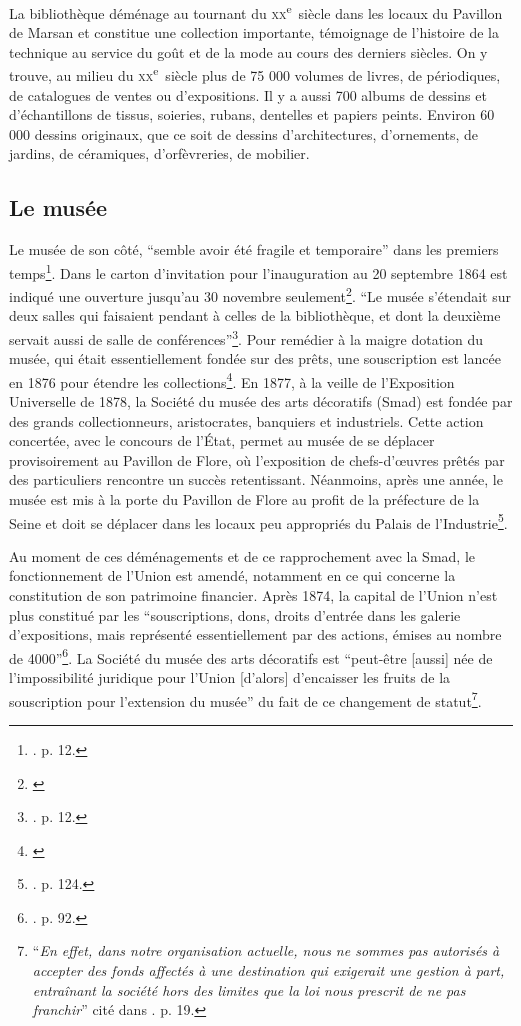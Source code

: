 La bibliothèque déménage au tournant du \textsc{xx}\textsuperscript{e}~siècle dans les locaux du Pavillon de Marsan et constitue une collection importante, témoignage de l'histoire de la technique au service du goût et de la mode au cours des derniers siècles. On y trouve, au milieu du \textsc{xx}\textsuperscript{e}~siècle plus de 75 000 volumes de livres, de périodiques, de catalogues de ventes ou d'expositions. Il y a aussi 700 albums de dessins et d'échantillons de tissus, soieries, rubans, dentelles et papiers peints. Environ 60 000 dessins originaux, que ce soit de dessins d'architectures, d'ornements, de jardins, de céramiques, d'orfèvreries, de mobilier. \hfill \pagebreak

\subsection{Le musée}

Le musée de son côté, \enquote{semble avoir été fragile et temporaire} dans les premiers temps\footnote{\cite{gady_dessin_2020}. p. 12.}. Dans le carton d'invitation pour l'inauguration au 20 septembre 1864 est indiqué une ouverture jusqu'au 30 novembre seulement\footnote{\cite{noauthor__1864-1}}. \enquote{Le musée s'étendait sur deux salles qui faisaient pendant à celles de la bibliothèque, et dont la deuxième servait aussi de salle de conférences}\footnote{\cite{gady_dessin_2020}. p. 12.}. Pour remédier à la maigre dotation du musée, qui était essentiellement fondée sur des prêts, une souscription est lancée en 1876 pour étendre les collections\footnote{\cite{noauthor__1876}}. En 1877, à la veille de l'Exposition Universelle de 1878, la Société du musée des arts décoratifs (Smad) est fondée par des grands collectionneurs, aristocrates, banquiers et industriels. Cette action concertée, avec le concours de l'État, permet au musée de se déplacer provisoirement au Pavillon de Flore, où l'exposition de chefs-d’œuvres prêtés par des particuliers rencontre un succès retentissant. Néanmoins, après une année, le musée est mis à la porte du Pavillon de Flore au profit de la préfecture de la Seine et doit se déplacer dans les locaux peu appropriés du Palais de l'Industrie\footnote{\cite{froissart_union_1990}. p. 124.}.

Au moment de ces déménagements et de ce rapprochement avec la Smad, le fonctionnement de l'Union est amendé, notamment en ce qui concerne la constitution de son patrimoine financier. Après 1874, la capital de l'Union n'est plus constitué par les \enquote{souscriptions, dons, droits d'entrée dans les galerie d'expositions, mais représenté essentiellement par des actions, émises au nombre de 4000}\footnote{\cite{froissart_union_1990}. p. 92.}. La Société du musée des arts décoratifs est \enquote{peut-être [aussi] née de l'impossibilité juridique pour l'Union [d'alors] d'encaisser les fruits de la souscription pour l'extension du musée} du fait de ce changement de statut\footnote{\cite{noauthor__1876}\enquote{\textit{En effet, dans notre organisation actuelle, nous ne sommes pas autorisés à accepter des fonds affectés à une destination qui exigerait une gestion à part, entraînant la société hors des limites que la loi nous prescrit de ne pas franchir}} cité dans \cite{gady_dessin_2020}. p. 19.}. 

